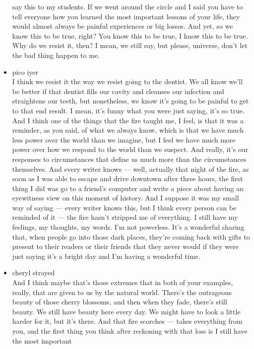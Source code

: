 \begin{itemize}
  say this to my students. If we went around the circle and I said you
  have to tell everyone how you learned the most important lessons of
  your life, they would almost always be painful experiences or big
  losses. And yet, so we know this to be true, right? You know this to
  be true, I know this to be true. Why do we resist it, then? I mean, we
  still say, but please, universe, don't let the bad thing happen to me.
\item
  pico iyer\\
  I think we resist it the way we resist going to the dentist. We all
  know we'll be better if that dentist fills our cavity and cleanses our
  infection and straightens our teeth, but nonetheless, we know it's
  going to be painful to get to that end result. I mean, it's funny what
  you were just saying, it's so true. And I think one of the things that
  the fire taught me, I feel, is that it was a reminder, as you said, of
  what we always know, which is that we have much less power over the
  world than we imagine, but I feel we have much more power over how we
  respond to the world than we suspect. And really, it's our responses
  to circumstances that define us much more than the circumstances
  themselves. And every writer knows --- well, actually that night of
  the fire, as soon as I was able to escape and drive downtown after
  three hours, the first thing I did was go to a friend's computer and
  write a piece about having an eyewitness view on this moment of
  history. And I suppose it was my small way of saying --- every writer
  knows this, but I think every person can be reminded of it --- the
  fire hasn't stripped me of everything. I still have my feelings, my
  thoughts, my words. I'm not powerless. It's a wonderful sharing that,
  when people go into those dark places, they're coming back with gifts
  to present to their readers or their friends that they never would if
  they were just saying it's a bright day and I'm having a wonderful
  time.
\item
  cheryl strayed\\
  And I think maybe that's those extremes that in both of your examples,
  really, that are given to us by the natural world. There's the
  outrageous beauty of those cherry blossoms, and then when they fade,
  there's still beauty. We still have beauty here every day. We might
  have to look a little harder for it, but it's there. And that fire
  scorches --- takes everything from you, and the first thing you think
  after reckoning with that loss is I still have the most important

\end{itemize}

